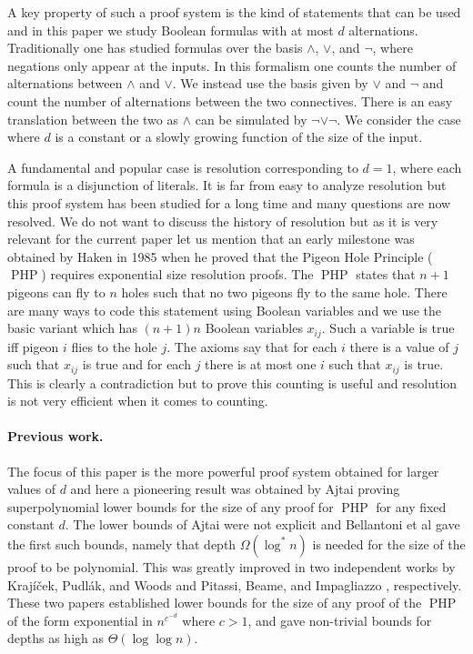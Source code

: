 \documentclass{article}\usepackage[a4paper,margin=20mm]{geometry}
\DeclareMathOperator{\PHP}{PHP}
\begin{document}
A key property of such a proof system is the kind
of statements that can be used and in
this paper we study Boolean formulas with at most $d$ alternations.
Traditionally one has studied formulas over the basis $\land$,
$\lor$, and $\neg$, where negations only appear at the 
inputs.  In this formalism one counts the number of alternations
between $\land$ and $\lor$.  We instead use the basis given
by $\lor$ and $\neg$ and count the number of alternations between
the two connectives.  There is an easy translation between the
two as $\land$ can be simulated by $\neg \lor \neg$.  We 
consider the case where $d$ is a constant or a slowly growing
function of the size of the input.

A fundamental and popular case is resolution
corresponding to $d=1$, where each formula is a disjunction of literals. 
It is far from easy to analyze resolution
but this proof system has been studied for a long time
and many questions are now resolved.  We do not want to
discuss the history of resolution but as it is very relevant
for the current paper let us mention that an  early milestone
was obtained by Haken \cite{haken} in 1985 when he proved
that the Pigeon Hole Principle ($\PHP$) requires exponential
size resolution proofs.  The $\PHP$ states that $n+1$ pigeons can 
fly to $n$ holes such that no two pigeons fly to the
same hole.  There are many ways to code this statement
using Boolean variables and we use the basic variant
which has $(n+1)n$ Boolean variables $x_{ij}$.  
Such a variable is true 
iff pigeon $i$ flies to the hole $j$.
The axioms say that for each $i$ there is a value
of $j$ such that $x_{ij}$ is true and for 
each $j$ there is at most one $i$ such that $x_{ij}$
is true.  This is clearly a contradiction but to
prove this counting is useful and resolution is not very 
efficient when it comes to counting.

\paragraph{Previous work.} The focus of this paper is the more
powerful proof system obtained for larger values of 
$d$ and here a pioneering result was obtained by 
Ajtai \cite{Ajtai94Complexity} proving superpolynomial lower bounds 
for the size of any proof for $\PHP$ for any fixed constant $d$.
The lower bounds of Ajtai were not explicit and Bellantoni
et al \cite{BPU92ApproximationAS}
gave the first such bounds, namely that depth $\Omega(\log^* n)$ is
needed for the size of the proof to be polynomial.
This was greatly improved 
in two independent works
by Kraj\'{i}\v{c}ek, Pudl\'{a}k, and Woods \cite{KPW95FregePHPExp}
and Pitassi, Beame, and Impagliazzo \cite{PBI93ExponentialLowerBounds},
respectively.  These two papers established lower bounds
for the size of any proof of the $\PHP$
of the form exponential in $n^{c^{-d}}$ where $c>1$, and gave
non-trivial bounds for depths as high as $\Theta (\log {\log n})$.
\end{document}
